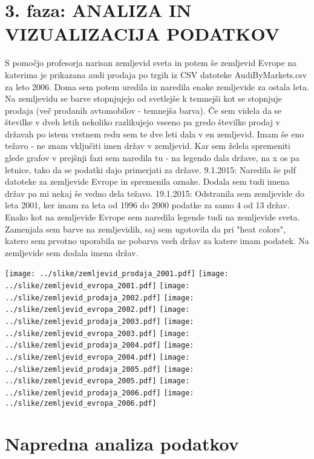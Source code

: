 \documentclass[11pt,a4paper]{article}
\begin{document}
\section{3. faza: ANALIZA IN VIZUALIZACIJA PODATKOV}
S pomočjo profesorja narisan zemljevid sveta in potem še zemljevid Evrope na katerima je prikazana audi prodaja po trgih iz CSV datoteke AudiByMarkets.csv za leto 2006. Doma sem potem uredila in naredila enake zemljevide za ostala leta. Na zemljevidu se barve stopnjujejo od svetlejše k temnejši kot se stopnjuje prodaja (več prodanih avtomobilov - temnejša barva). Če sem videla da se številke v dveh letih nekoliko razlikujejo vseeno pa gredo številke prodaj v državah po istem vrstnem redu sem te dve leti dala v en zemljevid. Imam še eno težavo - ne znam vključiti imen držav v zemljevid. Kar sem želela spremeniti glede grafov v prejšnji fazi sem naredila tu - na legendo dala države, na x os pa letnice, tako da se podatki dajo primerjati za države.
9.1.2015: Naredila še pdf datoteke za zemljevide Evrope in spremenila oznake. Dodala sem tudi imena držav pa mi nekaj še vedno dela težavo.
19.1.2015: Odstranila sem zemljevide do leta 2001, ker imam za leta od 1996 do 2000 podatke za samo 4 od 13 držav. Enako kot na zemljevide Evrope sem naredila legende tudi na zemljevide sveta. Zamenjala sem barve na zemljevidih, saj sem ugotovila da pri "heat colors", katero sem prvotno uporabila ne pobarva vseh držav za katere imam podatek. Na zemljevide sem dodala imena držav. 


\texttt{[image: ../slike/zemljevid\_prodaja\_2001.pdf]}
\texttt{[image: ../slike/zemljevid\_evropa\_2001.pdf]}
\texttt{[image: ../slike/zemljevid\_prodaja\_2002.pdf]}
\texttt{[image: ../slike/zemljevid\_evropa\_2002.pdf]}
\texttt{[image: ../slike/zemljevid\_prodaja\_2003.pdf]}
\texttt{[image: ../slike/zemljevid\_evropa\_2003.pdf]}
\texttt{[image: ../slike/zemljevid\_prodaja\_2004.pdf]}
\texttt{[image: ../slike/zemljevid\_evropa\_2004.pdf]}
\texttt{[image: ../slike/zemljevid\_prodaja\_2005.pdf]}
\texttt{[image: ../slike/zemljevid\_evropa\_2005.pdf]}
\texttt{[image: ../slike/zemljevid\_prodaja\_2006.pdf]}
\texttt{[image: ../slike/zemljevid\_evropa\_2006.pdf]}

\section{Napredna analiza podatkov}

\end{document}
